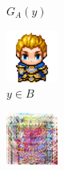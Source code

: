 \documentclass{beamer}
\begin{document}
\begin{frame}
\begin{figure}[htb]
\begin{subfigure}[b]{0.23\linewidth}
        \caption{$G_A(y)$}
      \end{subfigure}
      \begin{subfigure}[b]{0.23\linewidth}
        \includegraphics[width=\linewidth]{exp2_epoch100_real_B.png}
        \caption{$y \in B$}
      \end{subfigure}
      \begin{subfigure}[b]{0.23\linewidth}
        \includegraphics[width=\linewidth]{exp2_epoch100_fake_A.png}

\end{subfigure}
\end{figure}
\end{frame}
\end{document}
